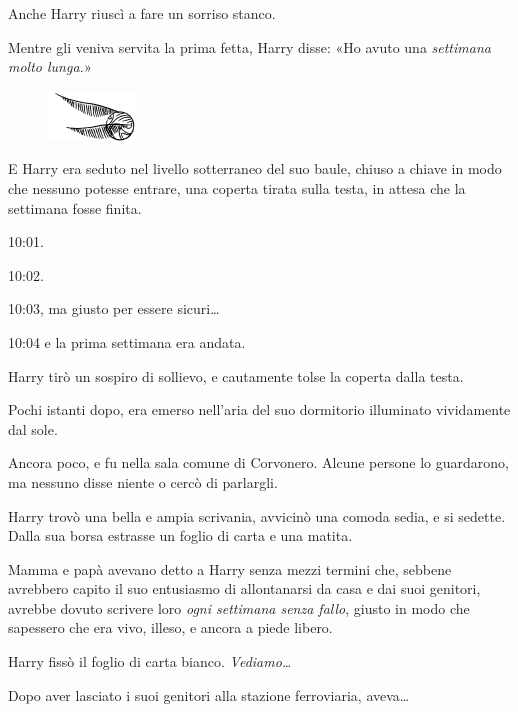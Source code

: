 Anche Harry riuscì a fare un sorriso stanco.

Mentre gli veniva servita la prima fetta, Harry disse: «Ho avuto una \textit{settimana molto lunga.}»

\begin{figure}[h!]
        \includegraphics[scale=0.4]{boccino.png}
        \centering
\end{figure}

E Harry era seduto nel livello sotterraneo del suo baule, chiuso a chiave in modo che nessuno potesse entrare, una coperta tirata sulla testa, in attesa che la settimana fosse finita.

10:01.

10:02.

10:03, ma giusto per essere sicuri…

10:04 e la prima settimana era andata.

Harry tirò un sospiro di sollievo, e cautamente tolse la coperta dalla testa.

Pochi istanti dopo, era emerso nell’aria del suo dormitorio illuminato vividamente dal sole.

Ancora poco, e fu nella sala comune di Corvonero. Alcune persone lo guardarono, ma nessuno disse niente o cercò di parlargli.

Harry trovò una bella e ampia scrivania, avvicinò una comoda sedia, e si sedette. Dalla sua borsa estrasse un foglio di carta e una matita.

Mamma e papà avevano detto a Harry senza mezzi termini che, sebbene avrebbero capito il suo entusiasmo di allontanarsi da casa e dai suoi genitori, avrebbe dovuto scrivere loro \textit{ogni settimana senza fallo}, giusto in modo che sapessero che era vivo, illeso, e ancora a piede libero.

Harry fissò il foglio di carta bianco. \textit{Vediamo…}

Dopo aver lasciato i suoi genitori alla stazione ferroviaria, aveva…

